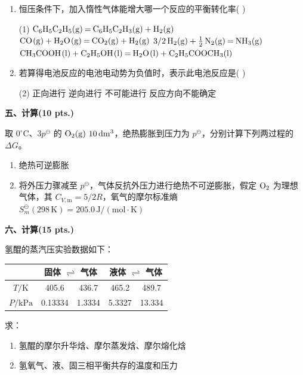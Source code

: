 \begin{enumerate}[label=\arabic*., itemsep=1.5ex]
    \item 恒压条件下，加入惰性气体能增大哪一个反应的平衡转化率( )
    \begin{tasks}(1)
        \task $\ce{C6H5C2H5(g) = C6H5C2H3(g) + H2(g)}$
        \task $\ce{CO(g) + H2O(g) = CO2(g) + H2(g)}$
        \task $3/2\,\ce{H2(g) + 1/2N2(g) = NH3(g)}$
        \task $\ce{CH3COOH(l) + C2H5OH(l) = H2O(l) + C2H5COOCH3(l)}$
    \end{tasks}

    \item 若算得电池反应的电池电动势为负值时，表示此电池反应是( )
    \begin{tasks}(2)
        \task 正向进行
        \task 逆向进行
        \task 不可能进行
        \task 反应方向不能确定
    \end{tasks}
\end{enumerate}

\vspace{0.5cm}
\noindent\textbf{五、计算(10 pts.)}

取 $0^\circ\text{C}$、$3p^\ominus$ 的 $\ce{O2(g)}\ 10\,\mathrm{dm^3}$，绝热膨胀到压力为 $p^\ominus$，分别计算下列两过程的 $\Delta G$。
\begin{enumerate}
    \item 绝热可逆膨胀
    \item 将外压力骤减至 $p^\ominus$，气体反抗外压力进行绝热不可逆膨胀，假定 $\ce{O2}$ 为理想气体，其 $C_{V,\text{m}}=5/2R$，氧气的摩尔标准熵 $S_m^\ominus(298\,\mathrm{K})=205.0\,\mathrm{J/(mol\cdot K)}$
\end{enumerate}

\vspace{0.5cm}
\noindent\textbf{六、计算(15 pts.)}

氢醌的蒸汽压实验数据如下：

\begin{center}
\begin{tabular}{|c|cc|cc|}
\hline
 & \multicolumn{2}{c|}{固体 $\rightleftharpoons$ 气体} & \multicolumn{2}{c|}{液体 $\rightleftharpoons$ 气体} \\
\hline
$T/\mathrm{K}$ & 405.6 & 436.7 & 465.2 & 489.7 \\
$P/\mathrm{kPa}$ & 0.13334 & 1.3334 & 5.3327 & 13.334 \\
\hline
\end{tabular}
\end{center}

求：
\begin{enumerate}
    \item 氢醌的摩尔升华焓、摩尔蒸发焓、摩尔熔化焓
    \item 氢氧气、液、固三相平衡共存的温度和压力
\end{enumerate}

